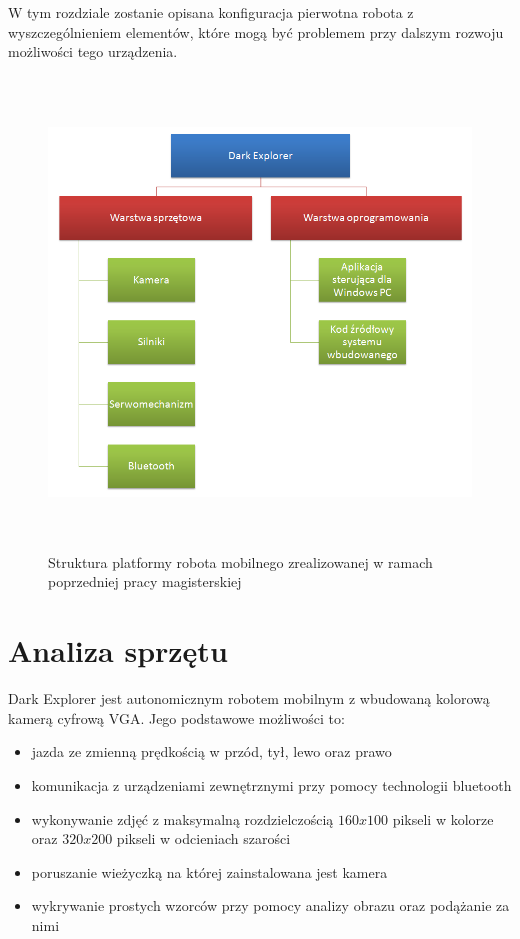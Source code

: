 W tym rozdziale zostanie opisana konfiguracja pierwotna robota z wyszczególnieniem elementów, które mogą być problemem przy dalszym rozwoju możliwości tego urządzenia.
\begin{figure}[!ht]
 \centering
 \includegraphics[height=125mm]{../images/ch02/kmak_platform.png}
 \caption{Struktura platformy robota mobilnego zrealizowanej w ramach
 poprzedniej pracy magisterskiej\cite{KmakMScThesis2009}}
 \label{fig:KmakPlatform}
\end{figure}

\section{Analiza sprzętu}
Dark Explorer jest autonomicznym robotem mobilnym z wbudowaną kolorową kamerą cyfrową VGA. Jego podstawowe możliwości to:
\begin{itemize}
 \item jazda ze zmienną prędkością w przód, tył, lewo oraz prawo
 \item komunikacja z urządzeniami zewnętrznymi przy pomocy technologii bluetooth
 \item wykonywanie zdjęć z maksymalną rozdzielczością $160x100$ pikseli w kolorze oraz $320x200$ pikseli w odcieniach szarości
 \item poruszanie wieżyczką na której zainstalowana jest kamera
 \item wykrywanie prostych wzorców przy pomocy analizy obrazu oraz podążanie za nimi
\end{itemize}

